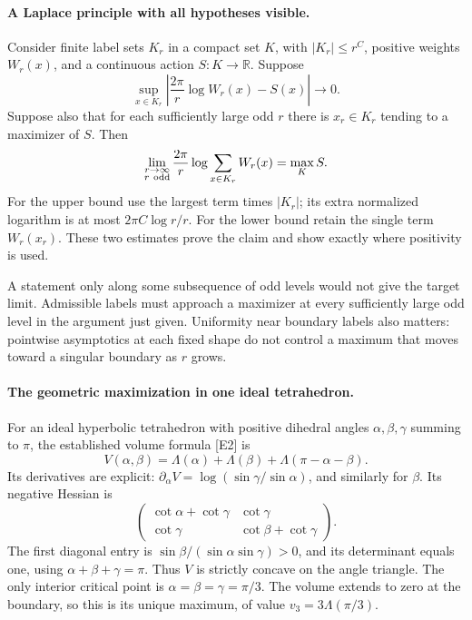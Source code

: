 \documentclass[11pt]{article}
\begin{document}
\paragraph{A Laplace principle with all hypotheses visible.}
Consider finite label sets $K_r$ in a compact set $K$,
with $|K_r|\leq r^C$, positive weights $W_r(x)$,
and a continuous action $S:K\to\mathbb R$. Suppose
\[
 \sup_{x\in K_r}
 \left|\frac{2\pi}{r}\log W_r(x)-S(x)\right|
                                  \longrightarrow0.
\]
Suppose also that for each sufficiently large odd $r$
there is $x_r\in K_r$ tending to a maximizer of $S$.
Then
\begin{equation}\label{a431:laplace}
 \lim_{\substack{r\to\infty\\r\ {\rm odd}}}
       \frac{2\pi}{r}\log\sum_{x\in K_r}W_r(x)
                                      =\max_KS.
\end{equation}
For the upper bound use the largest term times $|K_r|$;
its extra normalized logarithm is at most
$2\pi C\log r/r$. For the lower bound retain the
single term $W_r(x_r)$. These two estimates prove
the claim and show exactly where positivity is used.

A statement only along some subsequence of odd levels
would not give the target limit. Admissible labels
must approach a maximizer at every sufficiently
large odd level in the argument just given.
Uniformity near boundary labels also matters:
pointwise asymptotics at each fixed shape do not
control a maximum that moves toward a singular
boundary as $r$ grows.

\paragraph{The geometric maximization in one ideal tetrahedron.}
For an ideal hyperbolic tetrahedron with positive
dihedral angles $\alpha,\beta,\gamma$ summing to $\pi$,
the established volume formula [E2] is
\[
 V(\alpha,\beta)=
 \Lambda(\alpha)+\Lambda(\beta)+\Lambda(\pi-\alpha-\beta).
\]
Its derivatives are explicit:
$\partial_\alpha V=\log(\sin\gamma/\sin\alpha)$,
and similarly for $\beta$. Its negative Hessian is
\[
 \begin{pmatrix}
 \cot\alpha+\cot\gamma&\cot\gamma\\
 \cot\gamma&\cot\beta+\cot\gamma
 \end{pmatrix}.
\]
The first diagonal entry is
$\sin\beta/(\sin\alpha\sin\gamma)>0$, and its
determinant equals one, using
$\alpha+\beta+\gamma=\pi$.
Thus $V$ is strictly concave on the angle triangle.
The only interior critical point is
$\alpha=\beta=\gamma=\pi/3$. The volume extends
to zero at the boundary, so this is its unique
maximum, of value $v_3=3\Lambda(\pi/3)$.
\end{document}
